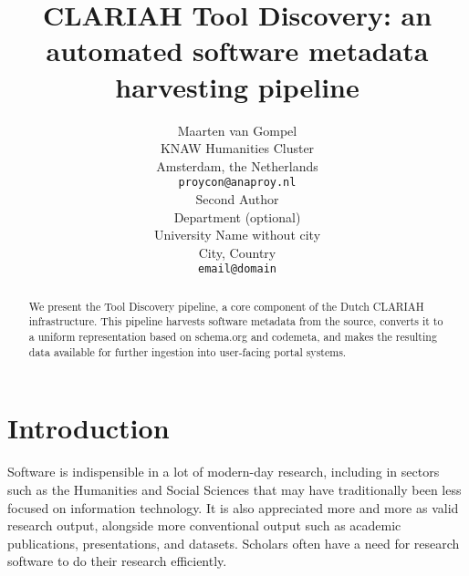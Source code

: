 \documentclass[a4paper,11pt]{article}
\title{CLARIAH Tool Discovery: an automated software metadata harvesting pipeline}
\author{Maarten van Gompel \\
  KNAW Humanities Cluster \\
  Amsterdam, the Netherlands \\
  {\tt proycon@anaproy.nl} \\\And %
  Second Author \\
  Department (optional)\\
  University Name without city \\
  City, Country \\
 {\tt email@domain} \\
}
\date{}
\begin{document}
\maketitle
\begin{abstract}
  We present the Tool Discovery pipeline, a core component of the Dutch CLARIAH infrastructure. This pipeline
  harvests software metadata from the source, converts it to a uniform representation based on schema.org and codemeta,
  and makes the resulting data available for further ingestion into user-facing portal systems. 
\end{abstract}

\section{Introduction} \label{intro}

%

Software is indispensible in a lot of modern-day research, including in sectors
such as the Humanities and Social Sciences that may have traditionally been
less focused on information technology. It is also appreciated more and more as
valid research output, alongside more conventional output such as academic
publications, presentations, and datasets. Scholars often have a need for
research software to do their research efficiently.
\end{document}
